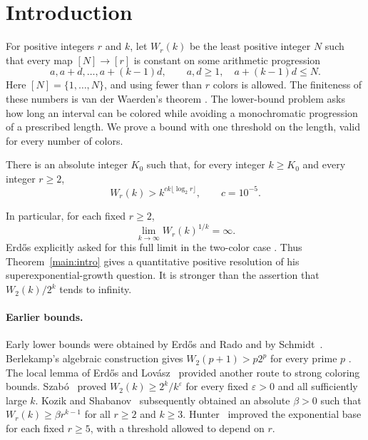 \section{Introduction}
\label{sec:introduction}

For positive integers $r$ and $k$, let $W_r(k)$ be the least positive
integer $N$ such that every map $[N]\to[r]$ is constant on some
arithmetic progression
\[
 a,a+d,\ldots,a+(k-1)d,\qquad a,d\ge1,\quad a+(k-1)d\le N.
\]
Here $[N]=\{1,\ldots,N\}$, and using fewer than $r$ colors is allowed.
The finiteness of these numbers is van der Waerden's theorem
\cite{vanDerWaerden1927}.
The lower-bound problem asks how long an interval can be colored while
avoiding a monochromatic progression of a prescribed length. We prove
a bound with one threshold on the length, valid for every number of
colors.

\begin{theorem}
\label{main:intro}
There is an absolute integer $K_0$ such that, for every integer
$k\ge K_0$ and every integer $r\ge2$,
\[
 W_r(k)>k^{c k\lfloor\log_2r\rfloor},
 \qquad c=10^{-5}.
\]
\end{theorem}

In particular, for each fixed $r\ge2$,
\[
 \lim_{k\to\infty}W_r(k)^{1/k}=\infty.
\]
Erd\H{o}s explicitly asked for this full limit in the two-color case
\cite[p.~90, (2)]{erdos1980}.
Thus Theorem~\ref{main:intro} gives a quantitative positive resolution
of his superexponential-growth question.
It is stronger than the assertion that $W_2(k)/2^k$ tends to infinity.

\paragraph{Earlier bounds.}
Early lower bounds were obtained by Erd\H{o}s and Rado
\cite{erdosRado1952} and by Schmidt~\cite{schmidt1962}.
Berlekamp's algebraic construction gives
$W_2(p+1)>p2^p$ for every prime $p$ \cite[Theorem~2]{berlekamp1968}.
The local lemma of Erd\H{o}s and Lov\'asz~\cite{erdosLovasz1975}
provided another route to strong coloring bounds.
Szab\'o~\cite[Theorem~2]{szabo1990} proved
$W_2(k)\ge 2^k/k^\varepsilon$ for every fixed $\varepsilon>0$
and all sufficiently large $k$.
Kozik and Shabanov~\cite[Theorem~2]{kozikShabanov2016}
subsequently obtained an absolute $\beta>0$ such that
$W_r(k)\ge\beta r^{k-1}$ for all $r\ge2$ and $k\ge3$.
Hunter~\cite[Theorem~1]{hunter2025} improved the exponential base
for each fixed $r\ge5$, with a threshold allowed to depend on $r$.

